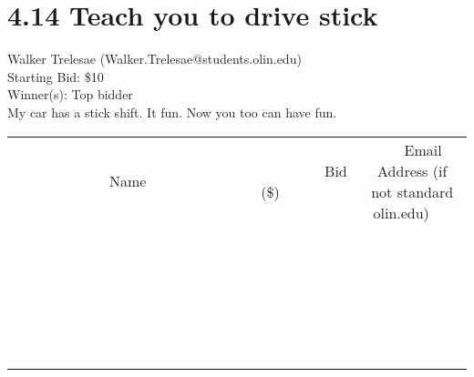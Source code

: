 \documentclass[11pt]{article}
\begin{document}
\section*{4.14 Teach you to drive stick}
Walker Trelesae (Walker.Trelesae@students.olin.edu) \\
Starting Bid: \$10 \\
Winner(s): 
Top bidder \\
My car has a stick shift. It fun. Now you too can have fun. \\[6ex]
\begin{tabular}{c c c}
~~~~~~~~~~~~~Name~~~~~~~~~~~~~ & ~~~~~~~~~Bid (\$)~~~~~~~~~ & ~~~Email Address (if not standard olin.edu)~~~ \\
 & & \\
\hline
 & & \\
\hline
 & & \\
\hline
 & & \\
\hline
 & & \\
\hline
 & & \\
\hline
 & & \\
\hline
 & & \\
\hline
 & & \\
\hline
 & & \\
\hline
 & & \\
\hline
 & & \\
\hline
 & & \\
\hline
 & & \\
\hline
 & & \\
\hline
 & & \\
\hline
 & & \\
\hline
 & & \\
\hline
 & & \\
\hline
 & & \\
\hline
 & & \\
\hline
 & & \\
\hline
 & & \\
\hline
 & & \\
\hline
 & & \\
\hline
 & & \\
\hline
\end{tabular}
\clearpage
\end{document}
